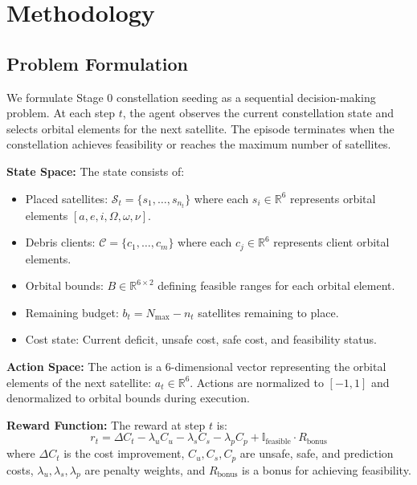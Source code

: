 \section{Methodology}
\label{sec:methodology}

\subsection{Problem Formulation}

We formulate Stage 0 constellation seeding as a sequential decision-making problem. At each step $t$, the agent observes the current constellation state and selects orbital elements for the next satellite. The episode terminates when the constellation achieves feasibility or reaches the maximum number of satellites.

\textbf{State Space:} The state consists of:
\begin{itemize}
    \item Placed satellites: $\mathcal{S}_t = \{s_1, \dots, s_{n_t}\}$ where each $s_i \in \mathbb{R}^6$ represents orbital elements $[a, e, i, \Omega, \omega, \nu]$.
    \item Debris clients: $\mathcal{C} = \{c_1, \dots, c_m\}$ where each $c_j \in \mathbb{R}^6$ represents client orbital elements.
    \item Orbital bounds: $B \in \mathbb{R}^{6 \times 2}$ defining feasible ranges for each orbital element.
    \item Remaining budget: $b_t = N_{\max} - n_t$ satellites remaining to place.
    \item Cost state: Current deficit, unsafe cost, safe cost, and feasibility status.
\end{itemize}

\textbf{Action Space:} The action is a 6-dimensional vector representing the orbital elements of the next satellite: $a_t \in \mathbb{R}^6$. Actions are normalized to $[-1, 1]$ and denormalized to orbital bounds during execution.

\textbf{Reward Function:} The reward at step $t$ is:
\begin{equation}
    r_t = \Delta C_t - \lambda_u C_u - \lambda_s C_s - \lambda_p C_p + \mathbb{I}_{\text{feasible}} \cdot R_{\text{bonus}}
\end{equation}
where $\Delta C_t$ is the cost improvement, $C_u, C_s, C_p$ are unsafe, safe, and prediction costs, $\lambda_u, \lambda_s, \lambda_p$ are penalty weights, and $R_{\text{bonus}}$ is a bonus for achieving feasibility.

